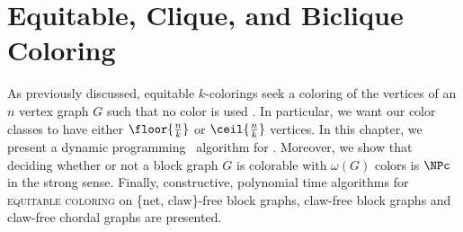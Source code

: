 \chapter{Equitable, Clique, and Biclique Coloring}
\label{ch:eq_coloring}

As previously discussed, equitable $k$-colorings seek a coloring of the vertices of an $n$ vertex graph $G$ such that no color is used . In particular, we want our color classes to have either $\floor{\frac{n}{k}}$ or $\ceil{\frac{n}{k}}$ vertices.
In this chapter, we present a dynamic programming \XP\ algorithm for .
Moreover, we show that deciding whether or not a block graph $G$ is colorable with $\omega(G)$ colors is $\NPc$ in the strong sense.
Finally, constructive, polynomial time algorithms for \textsc{equitable coloring} on \{net, claw\}-free block graphs, claw-free block graphs and claw-free chordal graphs are presented.


